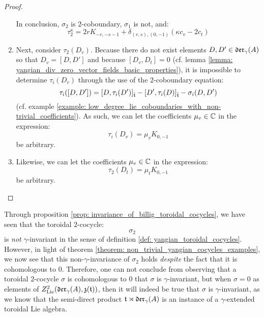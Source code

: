 \begin{proof}
\begin{enumerate}
                    In conclusion, $\sigma_2$ is $2$-coboundary, $\sigma_1$ is not, and:
                        $$\tau_2^{\kappa} = 2r K_{-r, -s - 1} + \delta_{(r, s), (0, -1)} ( \kappa c_v - 2c_t )$$
                    \item Next, consider $\tau_2(D_v)$. Because there do not exist elements $D, D' \in \mathfrak{der}_{\gamma}(A)$ so that $D_v = [D, D']$ and because $[D_v, D_t] = 0$ (cf. lemma \ref{lemma: yangian_div_zero_vector_fields_basic_properties}), it is impossible to determine $\tau_i(D_v)$ through the use of the $2$-coboundary equation:
                        $$\tau_i([D, D']) = [D, \tau_i(D')]_{\hat{\mathfrak{t}}} - [D', \tau_i(D)]_{\hat{\mathfrak{t}}} - \sigma_i(D, D')$$
                    (cf. example \ref{example: low_degree_lie_coboundaries_with_non-trivial_coefficients}). As such, we can let the coefficients $\mu_v \in \mathbb{C}$ in the expression:
                        $$\tau_i(D_v) = \mu_v K_{0, -1}$$
                    be arbitrary.
                    \item Likewise, we can let the coefficients $\mu_v \in \mathbb{C}$ in the expression:
                        $$\tau_2(D_t) = \mu_t K_{0, -1}$$
                    be arbitrary.
                \end{enumerate}
            \end{proof}
        \begin{remark}
            Through proposition \ref{prop: invariance_of_billig_toroidal_cocycles}, we have seen that the toroidal $2$-cocycle:
                $$\sigma_2$$
            is \textit{not} $\gamma$-invariant in the sense of definition \ref{def: yangian_toroidal_cocycles}. However, in light of theorem \ref{theorem: non_trivial_yangian_cocycles_examples}, we now see that this non-$\gamma$-invariance of $\sigma_2$ holds \textit{despite} the fact that it is cohomologous to $0$. Therefore, one can not conclude from observing that a toroidal $2$-cocycle $\sigma$ is cohomologous to $0$ that $\sigma$ is $\gamma$-invariant, but when $\sigma = 0$ as elements of $Z^2_{\mathrm{Lie}}(\mathfrak{der}_{\gamma}(A), \mathfrak{z}(\mathfrak{t}))$, then it will indeed be true that $\sigma$ is $\gamma$-invariant, as we know that the semi-direct product $\mathfrak{t} \rtimes \mathfrak{der}_{\gamma}(A)$ is an instance of a $\gamma$-extended toroidal Lie algebra.
        \end{remark}